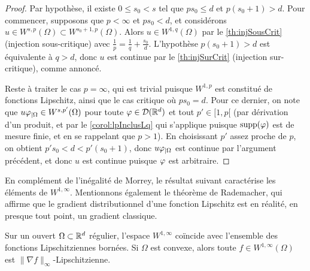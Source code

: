 \begin{proof}
	Par hypothèse, il existe $0 \leq s_0 < s$ tel que $p s_0 \leq d$ et $p(s_0+1) > d$. 
	Pour commencer, supposons que $p<\infty$ et $ps_0 < d$, et considérons $u \in W^{s,p}(\Omega) \subset W^{s_0+1,p}(\Omega)$. Alors $u \in W^{1,q}(\Omega)$ par le \cref{th:injSousCrit} (injection sous-critique) avec $\frac 1 p = \frac 1 q + \frac{s_0} d$. 
	L'hypothèse $p(s_0+1) > d$ est équivalente à $q>d$, donc $u$ est continue par le \cref{th:injSurCrit} (injection sur-critique), comme annoncé. 
	
	Reste à traiter le cas $p=\infty$, qui est trivial puisque $W^{1,p}$ est constitué de fonctions Lipschitz, ainsi que le cas critique où $p s_0 = d$. Pour ce dernier, on note que $u \varphi_{|\Omega} \in W^{s,p'}(\Omega)$ pour toute $\varphi \in \mathcal{D}(\mathbb{R}^d)$ et tout $p'\in [1,p[$ (par dérivation d'un produit, et par le \cref{corol:lpInclusLq} qui s'applique puisque $\operatorname{supp}(\varphi)$ est de mesure finie, et en se rappelant que $p>1$). En choisissant $p'$ assez proche de $p$, on obtient $p's_0 < d < p'(s_0+1)$, donc $u \varphi_{|\Omega}$ est continue par l'argument précédent, et donc $u$ est continue puisque $\varphi$ est arbitraire.
\end{proof}




En complément de l'inégalité de Morrey, le résultat suivant caractérise les éléments de $W^{1,\infty}$. Mentionnons également le théorème de Rademacher, qui affirme que le gradient distributionnel d'une fonction Lipschitz est en réalité, en presque tout point, un gradient classique.

\begin{theorem}
\label{th:W1inf_iff_Lip}
%
Sur un ouvert $\Omega\subset \mathbb{R}^d$ régulier, l'espace $W^{1,\infty}$ coïncide avec l'ensemble des fonctions Lipschitziennes bornées. Si $\Omega$ est convexe, alors toute $f \in W^{1,\infty}(\Omega)$ est $\|\nabla f\|_\infty$-Lipschitzienne.
\end{theorem}

